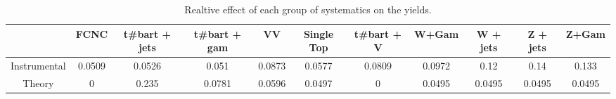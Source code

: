 \begin{table}[htbp]
\begin{center}
\begin{tabular}{|c|c|c|c|c|c|c|c|c|c|c|}
\hline 
      & FCNC      & t#bar{t} + jets      & t#bar{t} +  gam      & VV      & Single Top      & t#bar{t} + V      & W+Gam      & W + jets      & Z + jets      & Z+Gam \\ 
\hline 
 Instrumental & 0.0509 & 0.0526 & 0.051 & 0.0873 & 0.0577 & 0.0809 & 0.0972 & 0.12 & 0.14 & 0.133 \\ 
 Theory & 0 & 0.235 & 0.0781 & 0.0596 & 0.0497 & 0 & 0.0495 & 0.0495 & 0.0495 & 0.0495 \\ 
\hline 
\end{tabular} 
\caption{Realtive effect of each group of systematics on the yields.} 
\end{center} 
\end{table} 
